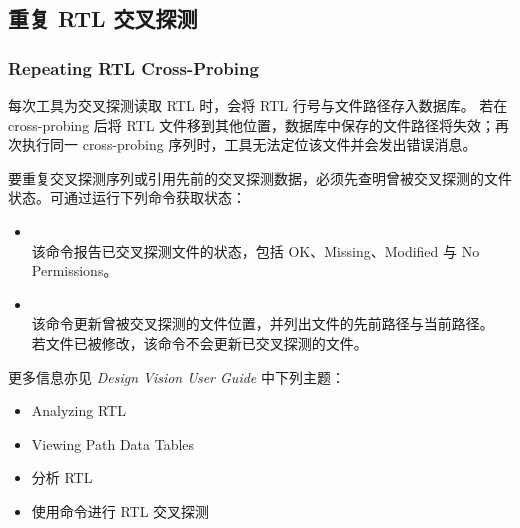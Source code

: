 \subsection{重复 RTL 交叉探测}
\subsubsection*{Repeating RTL Cross-Probing}

每次工具为交叉探测读取 RTL 时，会将 RTL 行号与文件路径存入数据库。
若在 cross-probing 后将 RTL 文件移到其他位置，数据库中保存的文件路径将失效；再次执行同一 cross-probing 序列时，工具无法定位该文件并会发出错误消息。

要重复交叉探测序列或引用先前的交叉探测数据，必须先查明曾被交叉探测的文件状态。可通过运行下列命令获取状态：
\begin{itemize}
  \item {}\\
        该命令报告已交叉探测文件的状态，包括 OK、Missing、Modified 与 No Permissions。
  \item {}\\
        该命令更新曾被交叉探测的文件位置，并列出文件的先前路径与当前路径。
        若文件已被修改，该命令不会更新已交叉探测的文件。
\end{itemize}

更多信息亦见 \textit{Design Vision User Guide} 中下列主题：
\begin{itemize}
  \item Analyzing RTL
  \item Viewing Path Data Tables
\end{itemize}

\begin{seeAlsoBox}
\begin{itemize}
  \item 分析 RTL
  \item 使用命令进行 RTL 交叉探测
\end{itemize}
\end{seeAlsoBox}
